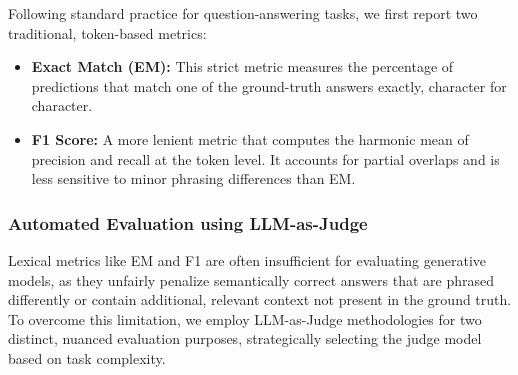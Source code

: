 \documentclass[11pt]{article}
\begin{document}
Following standard practice for question-answering tasks, we first report two traditional, token-based metrics:

\begin{itemize}
    \item \textbf{Exact Match (EM):} This strict metric measures the percentage of predictions that match one of the ground-truth answers exactly, character for character.
    \item \textbf{F1 Score:} A more lenient metric that computes the harmonic mean of precision and recall at the token level. It accounts for partial overlaps and is less sensitive to minor phrasing differences than EM.
\end{itemize}

\subsubsection{Automated Evaluation using LLM-as-Judge}

Lexical metrics like EM and F1 are often insufficient for evaluating generative models, as they unfairly penalize semantically correct answers that are phrased differently or contain additional, relevant context not present in the ground truth. To overcome this limitation, we employ LLM-as-Judge methodologies for two distinct, nuanced evaluation purposes, strategically selecting the judge model based on task complexity.
\end{document}
